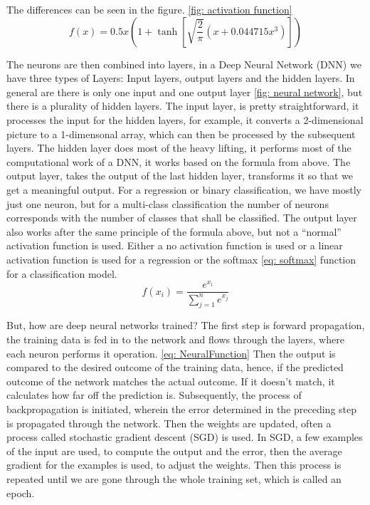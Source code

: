 The differences can be seen in the figure. \ref{fig: activation function}
\begin{equation}
    f(x) = 0.5x\left ( 1+\tanh\left [ \sqrt{\frac{2}{\pi}}\left ( x+0.044715x^3 \right ) \right ] \right )
    \label{eq: gelu}
\end{equation}

The neurons are then combined into layers, in a Deep Neural Network (DNN) we have three types of Layers:
Input layers, output layers and the hidden layers.
In general are there is only one input and one output layer \ref{fig: neural network}, but there is a plurality of hidden layers.
The input layer, is pretty straightforward, it processes the input for the hidden layers, for example, it converts a 2-dimensional picture to a 1-dimensonal array,
which can then be processed by the subsequent layers.
The hidden layer does most of the heavy lifting, it performs most of the computational work of a DNN, it works based on the formula from above.
The output layer, takes the output of the last hidden layer, transforms it so that we get a meaningful output.
For a regression or binary classification, we have mostly just one neuron, but for a multi-class classification the number of neurons corresponds with the number of classes that shall be classified.
The output layer also works after the same principle of the formula above, but not a “normal” activation function is used.
Either a no activation function is used or a linear activation function is used for a regression or the softmax \ref{eq: softmax} function for a classification model.
\begin{equation}
    f(x_i) = \frac{e^{x_i}}{\sum^n_{j=1}e^{x_j}}
    \label{eq: softmax}
\end{equation}

But, how are deep neural networks trained? \cite{lecun_deep_2015}
The first step is forward propagation, the training data is fed in to the network and flows through the layers, where each neuron performs it operation. \ref{eq: NeuralFunction}
Then the output is compared to the desired outcome of the training data, hence, if the predicted outcome of the network matches the actual outcome.
If it doesn't match, it calculates how far off the prediction is.
Subsequently, the process of backpropagation is initiated, wherein the error determined in the preceding step is propagated through the network.
Then the weights are updated, often a process called stochastic gradient descent (SGD) is used.
In SGD, a few examples of the input are used, to compute the output and the error, then the average gradient for the examples is used, to adjust the weights.
Then this process is repeated until we are gone through the whole training set, which is called an epoch.
